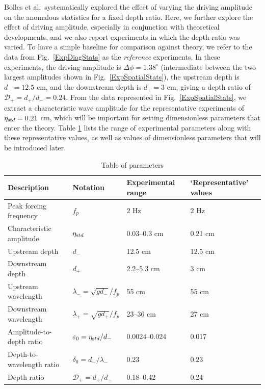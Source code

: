 \documentclass[11pt]{article}
\newcommand{\eps}{\varepsilon}
\newcommand{\etastd}{\eta_{\text std}}
\newcommand{\depth}{d}
\newcommand{\dup}{\depth_{-}}
\newcommand{\ddn}{\depth_{+}}
\newcommand{\lam}{\lambda}
\newcommand{\lamup}{\lam_{-}}
\newcommand{\lamdn}{\lam_{+}}
\newcommand{\drat}{\mathcal{D}}
\newcommand{\dratdn}{\drat_+}
\newcommand{\epsup}{\eps_0}
\newcommand{\delup}{\delta_0}
\newcommand{\Dphi}{\Delta \phi}
\begin{document}
	Bolles et al.~systematically explored the effect of varying the driving amplitude on the anomalous statistics for a fixed depth ratio. 
Here, we further explore the effect of driving amplitude, especially in conjunction with theoretical developments, and we also report experiments in which the depth ratio was varied. 
To have a simple baseline for comparison against theory, we refer to the data from Fig.~\ref{ExpDiagStats} as the {\em reference} experiments. In these experiments, the driving amplitude is $\Dphi = 1.38^{\circ}$ (intermediate between the two largest amplitudes shown in Fig.~\ref{ExpSpatialStats}), the upstream depth is $\dup = 12.5$ cm, and the downstream depth is $\ddn = 3$ cm, giving a depth ratio of $\dratdn = \ddn/\dup= 0.24$. From the data represented in Fig.~\ref{ExpSpatialStats}, we extract a characteristic wave amplitude for the representative experiments of $\etastd = 0.21$ cm, which will be important for setting dimensionless parameters that enter the theory. Table \ref{paramtable} lists the range of experimental parameters along with these representative values, as well as values of dimensionless parameters that will be introduced later.

\begin{table}[h]%
\begin{center}
\caption{Table of parameters}
\label{paramtable}
\begin{tabular}{l l l l}
\hline Description & Notation & Experimental range & `Representative' values \\
\hline
Peak forcing frequency	& $f_p$					& 2 Hz 		& 2 Hz \\
Characteristic amplitude	& $\etastd$				& 0.03--0.3 cm	& 0.21 cm \\
Upstream depth		& $\dup$					& 12.5 cm 	& 12.5 cm \\
Downstream depth		& $\ddn$					& 2.2--5.3 cm	& 3 cm \\
Upstream wavelength	& $\lamup = \sqrt{g \dup}/f_p$	& 55 cm 		& 55 cm \\
Downstream wavelength	& $\lamdn = \sqrt{g \ddn}/f_p$	& 23--36 cm	& 27 cm \\
%
Amplitude-to-depth ratio	& $\epsup = \etastd / \dup$	&0.0024--0.024	& 0.017 \\
Depth-to-wavelength ratio	& $\delup = \dup / \lamup$	& 0.23		& 0.23 \\
Depth ratio			& $\dratdn = \ddn/\dup$		& 0.18--0.42	& 0.24
\end{tabular}
\end{center}
\end{table}
\end{document}
